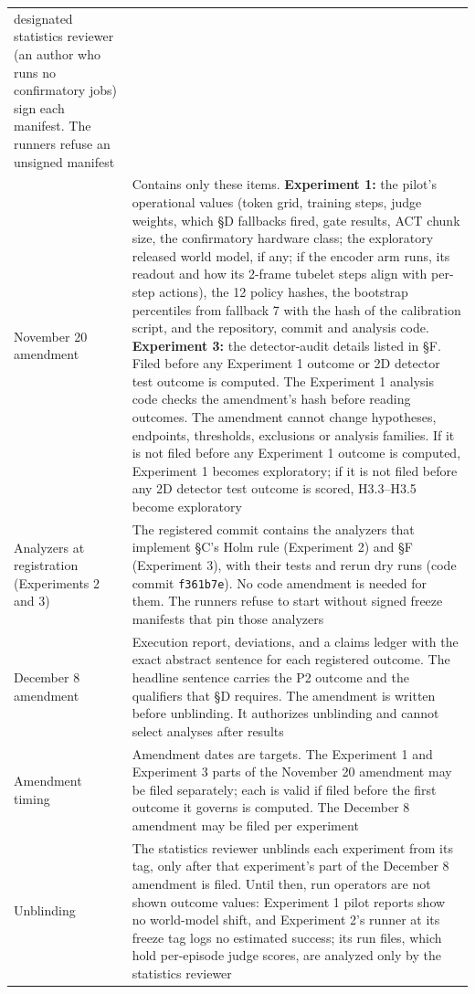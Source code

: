 \documentclass[10pt,letterpaper]{article}
\begin{document}
\begin{longtable}[]{@{}
  >{\raggedright\arraybackslash}p{}
  >{\raggedright\arraybackslash}p{}@{}}
designated statistics reviewer (an author who runs no
confirmatory jobs) sign each manifest. The runners refuse an
unsigned manifest \\
November 20 amendment & Contains only these items.
\textbf{Experiment 1:} the pilot's operational values (token
grid, training steps, judge weights, which §D fallbacks
fired, gate results, ACT chunk size, the confirmatory
hardware class; the exploratory released world model, if
any; if the encoder arm runs, its readout and how its
2-frame tubelet steps align with per-step actions), the 12
policy hashes, the bootstrap percentiles from fallback 7
with the hash of the calibration script, and the repository,
commit and analysis code. \textbf{Experiment 3:} the
detector-audit details listed in §F. Filed before any
Experiment 1 outcome or 2D detector test outcome is
computed. The Experiment 1 analysis code checks the
amendment's hash before reading outcomes. The amendment
cannot change hypotheses, endpoints, thresholds, exclusions
or analysis families. If it is not filed before any
Experiment 1 outcome is computed, Experiment 1 becomes
exploratory; if it is not filed before any 2D detector test
outcome is scored, H3.3--H3.5 become exploratory \\
Analyzers at registration (Experiments 2 and 3) & The
registered commit contains the analyzers that implement §C's
Holm rule (Experiment 2) and §F (Experiment 3), with their
tests and rerun dry runs (code commit \texttt{f361b7e}). No
code amendment is needed for them. The runners refuse to
start without signed freeze manifests that pin those
analyzers \\
December 8 amendment & Execution report, deviations, and a
claims ledger with the exact abstract sentence for each
registered outcome. The headline sentence carries the P2
outcome and the qualifiers that §D requires. The amendment
is written before unblinding. It authorizes unblinding and
cannot select analyses after results \\
Amendment timing & Amendment dates are targets. The
Experiment 1 and Experiment 3 parts of the November 20
amendment may be filed separately; each is valid if filed
before the first outcome it governs is computed. The
December 8 amendment may be filed per experiment \\
Unblinding & The statistics reviewer unblinds each
experiment from its tag, only after that experiment's part
of the December 8 amendment is filed. Until then, run
operators are not shown outcome values: Experiment 1 pilot
reports show no world-model shift, and Experiment 2's runner
at its freeze tag logs no estimated success; its run files,
which hold per-episode judge scores, are analyzed only by
the statistics reviewer \\
\end{longtable}
\endgroup
\end{document}
